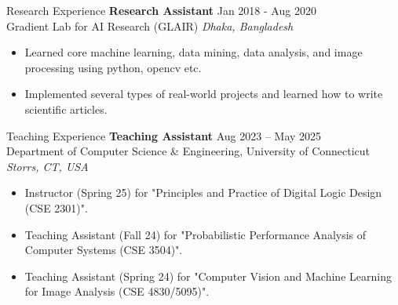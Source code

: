 \begin{rSection}{Research Experience}
{\bf Research Assistant} \hfill { Jan 2018 - Aug 2020}
\\ 
Gradient Lab for AI Research (GLAIR) \hfill \textit{Dhaka, Bangladesh}

 \begin{itemize}
    \itemsep -3pt {} 
     \item Learned core machine learning, data mining, data analysis, and image processing using python, opencv etc.
     \item Implemented several types of real-world projects and learned how to write scientific articles.
 \end{itemize}
\end{rSection}

\begin{rSection}{Teaching Experience}
\textbf{Teaching Assistant} \hfill {Aug 2023 -- May 2025}\\
Department of Computer Science \& Engineering, University of Connecticut \hfill \textit{Storrs, CT, USA}
 \begin{itemize}
    \itemsep -3pt {}
    \item Instructor (Spring 25) for "Principles and Practice of Digital Logic Design (CSE 2301)".
    \item Teaching Assistant (Fall 24) for "Probabilistic Performance Analysis of Computer Systems (CSE 3504)".
    \item Teaching Assistant (Spring 24) for "Computer Vision and Machine Learning for Image Analysis (CSE 4830/5095)".

\end{itemize}
\end{rSection}
